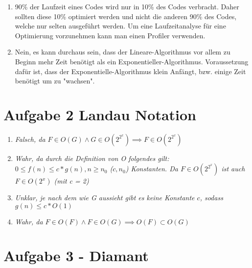 \begin{enumerate}
	\item %
	90\% der Laufzeit eines Codes wird nur in 10\% des Codes verbracht. Daher sollten diese 10\% optimiert werden und nicht die anderen 90\% des Codes, welche nur selten ausgeführt werden. Um eine Laufzeitanalyse für eine Optimierung vorzunehmen kann man einen Profiler verwenden.
	
	\item %
	Nein, es kann durchaus sein, dass der Lineare-Algorithmus vor allem zu Beginn mehr Zeit benötigt als ein Exponentieller-Algorithmus. Voraussetzung dafür ist, dass der Exponentielle-Algorithmus klein Anfängt, bzw. einige Zeit benötigt um zu "wachsen".
\end{enumerate}

\section*{Aufgabe 2  Landau Notation}
\begin{enumerate}
	\item
	\textit{Falsch, da $F \in O(G) \land G \in O(2^{2^x}) \implies F \in O(2^{2^x})$}
	\item
	\textit{Wahr, da durch die Definition von O folgendes gilt: $0 \leq f(n) \leq c*g(n), n\geq n_0$ ($c, n_0$) Konstanten. Da $F \in O(2^{2^x})$ ist auch $F \in O(2^x)$ (mit c = 2)}
	\item
	\textit{Unklar, je nach dem wie G aussieht gibt es keine Konstante $c$, sodass $g(n) \leq c * O(1)$}
	\item
	\textit{Wahr, da $F \in O(F) \land F \in O(G) \implies O(F) \subset O(G) $}
\end{enumerate}

\section*{Aufgabe 3 - Diamant}



